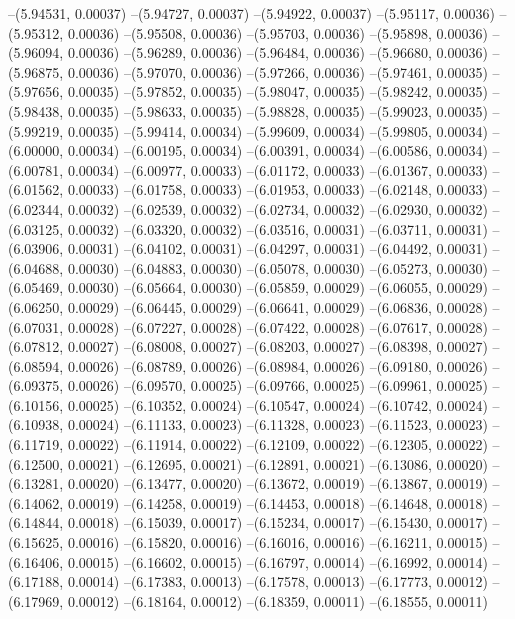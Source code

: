 --(5.94531, 0.00037)
--(5.94727, 0.00037)
--(5.94922, 0.00037)
--(5.95117, 0.00036)
--(5.95312, 0.00036)
--(5.95508, 0.00036)
--(5.95703, 0.00036)
--(5.95898, 0.00036)
--(5.96094, 0.00036)
--(5.96289, 0.00036)
--(5.96484, 0.00036)
--(5.96680, 0.00036)
--(5.96875, 0.00036)
--(5.97070, 0.00036)
--(5.97266, 0.00036)
--(5.97461, 0.00035)
--(5.97656, 0.00035)
--(5.97852, 0.00035)
--(5.98047, 0.00035)
--(5.98242, 0.00035)
--(5.98438, 0.00035)
--(5.98633, 0.00035)
--(5.98828, 0.00035)
--(5.99023, 0.00035)
--(5.99219, 0.00035)
--(5.99414, 0.00034)
--(5.99609, 0.00034)
--(5.99805, 0.00034)
--(6.00000, 0.00034)
--(6.00195, 0.00034)
--(6.00391, 0.00034)
--(6.00586, 0.00034)
--(6.00781, 0.00034)
--(6.00977, 0.00033)
--(6.01172, 0.00033)
--(6.01367, 0.00033)
--(6.01562, 0.00033)
--(6.01758, 0.00033)
--(6.01953, 0.00033)
--(6.02148, 0.00033)
--(6.02344, 0.00032)
--(6.02539, 0.00032)
--(6.02734, 0.00032)
--(6.02930, 0.00032)
--(6.03125, 0.00032)
--(6.03320, 0.00032)
--(6.03516, 0.00031)
--(6.03711, 0.00031)
--(6.03906, 0.00031)
--(6.04102, 0.00031)
--(6.04297, 0.00031)
--(6.04492, 0.00031)
--(6.04688, 0.00030)
--(6.04883, 0.00030)
--(6.05078, 0.00030)
--(6.05273, 0.00030)
--(6.05469, 0.00030)
--(6.05664, 0.00030)
--(6.05859, 0.00029)
--(6.06055, 0.00029)
--(6.06250, 0.00029)
--(6.06445, 0.00029)
--(6.06641, 0.00029)
--(6.06836, 0.00028)
--(6.07031, 0.00028)
--(6.07227, 0.00028)
--(6.07422, 0.00028)
--(6.07617, 0.00028)
--(6.07812, 0.00027)
--(6.08008, 0.00027)
--(6.08203, 0.00027)
--(6.08398, 0.00027)
--(6.08594, 0.00026)
--(6.08789, 0.00026)
--(6.08984, 0.00026)
--(6.09180, 0.00026)
--(6.09375, 0.00026)
--(6.09570, 0.00025)
--(6.09766, 0.00025)
--(6.09961, 0.00025)
--(6.10156, 0.00025)
--(6.10352, 0.00024)
--(6.10547, 0.00024)
--(6.10742, 0.00024)
--(6.10938, 0.00024)
--(6.11133, 0.00023)
--(6.11328, 0.00023)
--(6.11523, 0.00023)
--(6.11719, 0.00022)
--(6.11914, 0.00022)
--(6.12109, 0.00022)
--(6.12305, 0.00022)
--(6.12500, 0.00021)
--(6.12695, 0.00021)
--(6.12891, 0.00021)
--(6.13086, 0.00020)
--(6.13281, 0.00020)
--(6.13477, 0.00020)
--(6.13672, 0.00019)
--(6.13867, 0.00019)
--(6.14062, 0.00019)
--(6.14258, 0.00019)
--(6.14453, 0.00018)
--(6.14648, 0.00018)
--(6.14844, 0.00018)
--(6.15039, 0.00017)
--(6.15234, 0.00017)
--(6.15430, 0.00017)
--(6.15625, 0.00016)
--(6.15820, 0.00016)
--(6.16016, 0.00016)
--(6.16211, 0.00015)
--(6.16406, 0.00015)
--(6.16602, 0.00015)
--(6.16797, 0.00014)
--(6.16992, 0.00014)
--(6.17188, 0.00014)
--(6.17383, 0.00013)
--(6.17578, 0.00013)
--(6.17773, 0.00012)
--(6.17969, 0.00012)
--(6.18164, 0.00012)
--(6.18359, 0.00011)
--(6.18555, 0.00011)
